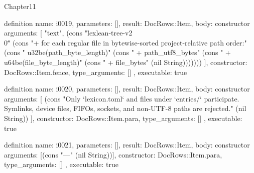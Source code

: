 \begin{lexlean}{Chapter11}
\begin{semanticmodule}
definition{
  name: i0019,
  parameters: [],
  result: DocRows::Item,
  body: constructor{
    arguments: [
      "text",
      (cons "\"lexlean-tree-v2\\0\"" (cons "+ for each regular file in bytewise-sorted project-relative path order:" (cons "    u32be(path_byte_length)" (cons "    + path_utf8_bytes" (cons "    + u64be(file_byte_length)" (cons "    + file_bytes" (nil String)))))))
    ],
    constructor: DocRows::Item.fence,
    type_arguments: []
  },
  executable: true
}

definition{
  name: i0020,
  parameters: [],
  result: DocRows::Item,
  body: constructor{
    arguments: [
      (cons "Only `lexicon.toml` and files under `entries/` participate. Symlinks, device files, FIFOs, sockets, and non-UTF-8 paths are rejected." (nil String))
    ],
    constructor: DocRows::Item.para,
    type_arguments: []
  },
  executable: true
}

definition{
  name: i0021,
  parameters: [],
  result: DocRows::Item,
  body: constructor{
    arguments: [(cons "---" (nil String))],
    constructor: DocRows::Item.para,
    type_arguments: []
  },
  executable: true
}
\end{semanticmodule}
\end{lexlean}
